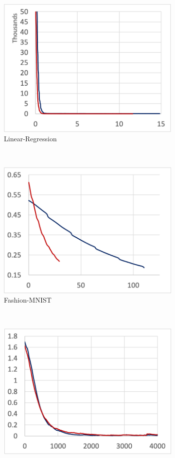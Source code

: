 \begin{figure}[!ht]
\begin{subfigure}[t]{.24\textwidth}
    \includegraphics[width=\textwidth]{tf2-04}
    \caption{Linear-Regression}
  \end{subfigure} 
  ~ 
  \begin{subfigure}[t]{.24\textwidth}
    \includegraphics[width=\textwidth]{tf2-05}
    \caption{Fashion-MNIST}
  \end{subfigure}
  ~
  \begin{subfigure}[t]{.24\textwidth}
    \includegraphics[width=\textwidth]{tf2-06}

\end{subfigure}
\end{figure}
